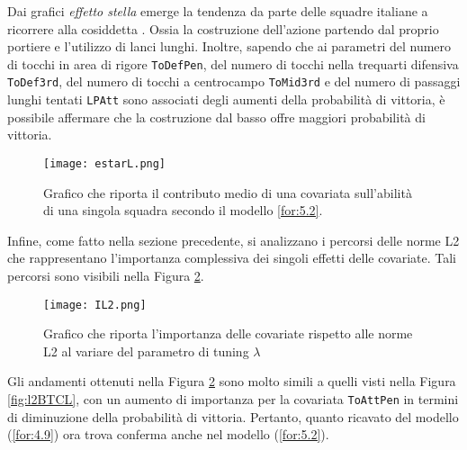 Dai grafici \emph{effetto stella} emerge la tendenza da parte delle squadre italiane a ricorrere alla cosiddetta \textit{\cite{costrdalbasso}}. Ossia la costruzione dell'azione partendo dal proprio portiere e l'utilizzo di lanci lunghi. Inoltre, sapendo che ai parametri del numero di tocchi in area di rigore \texttt{ToDefPen}, del numero di tocchi nella trequarti difensiva \texttt{ToDef3rd}, del numero di tocchi a centrocampo \texttt{ToMid3rd} e del numero di passaggi lunghi tentati \texttt{LPAtt} sono associati degli aumenti della probabilità di vittoria, è possibile affermare che la costruzione dal basso offre maggiori probabilità di vittoria.\\
\begin{figure}[]
	\begin{center}
		\texttt{[image: estarL.png]}
		\caption{Grafico che riporta il contributo medio di una covariata sull'abilità di una singola squadra secondo il modello \ref{for:5.2}.} \label{fig:effstar3}
	\end{center}
\end{figure}
Infine, come fatto nella sezione precedente, si analizzano i percorsi delle norme L2 che rappresentano l'importanza complessiva dei singoli effetti delle covariate. Tali percorsi sono visibili nella Figura \ref{fig:IL2}.

\begin{figure}[]
	\begin{center}
		\texttt{[image: IL2.png]}
		\caption{Grafico che riporta l'importanza delle covariate rispetto alle norme L2 al variare del parametro di tuning $\lambda$} \label{fig:IL2}
	\end{center}
\end{figure}

Gli andamenti ottenuti nella Figura \ref{fig:IL2} sono molto simili a quelli visti nella Figura \ref{fig:l2BTCL}, con un aumento di importanza per la covariata \texttt{ToAttPen} in termini di diminuzione della probabilità di vittoria. Pertanto, quanto ricavato del modello (\ref{for:4.9}) ora trova conferma anche nel modello (\ref{for:5.2}).

